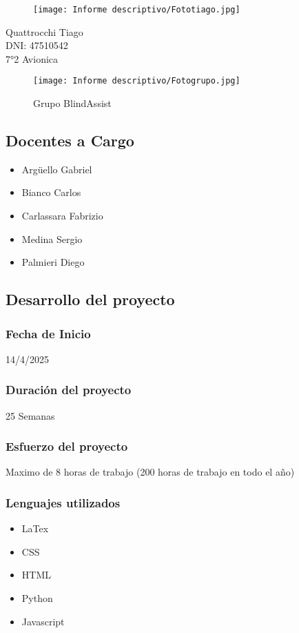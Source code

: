 \documentclass[12pt,a4paper]{article}
\begin{document}
\begin{figure}[H]
    \centering
    \texttt{[image: Informe descriptivo/Fototiago.jpg]}
\end{figure}

\begin{center}
Quattrocchi Tiago\\
DNI: 47510542\\
7°2 Avionica
\end{center}

\begin{figure}[H]
    \centering
    \texttt{[image: Informe descriptivo/Fotogrupo.jpg]}
    \caption{Grupo BlindAssist}
\end{figure}

\subsection{Docentes a Cargo}
    \begin{center}
        \begin{itemize}
        \item Argüello Gabriel
        \item Bianco Carlos
        \item Carlassara Fabrizio
        \item Medina Sergio
        \item Palmieri Diego
        \end{itemize}
    \end{center}

\subsection{Desarrollo del proyecto}
\subsubsection*{Fecha de Inicio}
14/4/2025
\subsubsection*{Duración del proyecto}
25 Semanas
\subsubsection*{Esfuerzo del proyecto}
Maximo de 8 horas de trabajo (200 horas de trabajo en todo el año)
\subsubsection*{Lenguajes utilizados}
\begin{itemize}
\item LaTex
\item CSS
\item HTML
\item Python
\item Javascript
\end{itemize}
\end{document}
